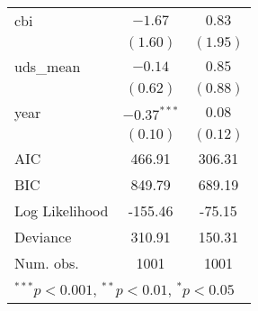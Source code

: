\begin{tabular}{l c c }
cbi                             & $-1.67$        & $0.83$      \\
                                & $(1.60)$       & $(1.95)$    \\
uds\_mean                       & $-0.14$        & $0.85$      \\
                                & $(0.62)$       & $(0.88)$    \\
year                            & $-0.37^{***}$  & $0.08$      \\
                                & $(0.10)$       & $(0.12)$    \\
\hline
AIC                             & 466.91         & 306.31      \\
BIC                             & 849.79         & 689.19      \\
Log Likelihood                  & -155.46        & -75.15      \\
Deviance                        & 310.91         & 150.31      \\
Num. obs.                       & 1001           & 1001        \\
\hline
\multicolumn{3}{l}{\scriptsize{$^{***}p<0.001$, $^{**}p<0.01$, $^*p<0.05$}}
\end{tabular}
